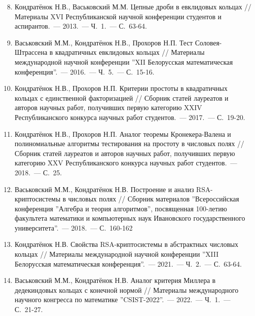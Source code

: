 \documentclass[_00_dissertation.tex]{subfiles}
\begin{document}
\begin{enumerate}
\setcounter{enumi}{7}

    \item \label{source:Republican_Scientific_Conference_of_Students_and_Postgraduates_2013}
    Кондратёнок Н.В., Васьковский М.М. Цепные дроби в евклидовых кольцах // Материалы XVI Республиканской научной конференции студентов и аспирантов.~--- 2013.~--- Ч.~1.~--- С.~63-64.

    \item \label{source:XII_Belarussian_math_conference_2016}
    Васьковский М.М., Кондратёнок Н.В., Прохоров Н.П. Тест Соловея-Штрассена в квадратичных евклидовых кольцах // Материалы международной научной конференции ''XII Белорусская математическая конференция''.~--- 2016.~--- Ч.~5.~--- С.~15-16.

    \item \label{source:Collection_of_articles_by_laureates_2017}
    Кондратёнок Н.В., Прохоров Н.П. Критерии простоты в квадратичных кольцах с единственной факторизацией // Сборник статей лауреатов и авторов научных работ, получивших первую категорию XXIV Республиканского конкурса научных работ студентов.~--- 2017.~--- С.~19-20.

    \item \label{source:Collection_of_articles_by_laureates_2018}
    Кондратёнок Н.В., Прохоров Н.П. Аналог теоремы Кронекера-Валена и полиномиальные алгоритмы тестирования на простоту в числовых полях // Сборник статей лауреатов и авторов научных работ, получивших первую категорию XXV Республиканского конкурса научных работ студентов.~--- 2018.~--- С.~25.

    \item \label{source:Algebra_and_theory_of_algorithms}
    Васьковский М.М., Кондратёнок Н.В. Построение и анализ RSA-криптосистемы в числовых полях // Сборник материалов ''Всероссийская конференция ''Алгебра и теория алгоритмов'', посвященная 100-летию факультета математики и компьютерных наук Ивановского государственного университета''.~--- 2018.~--- С.~160-162

    \item \label{source:XIII_Belarussian_math_conference_2021}
    Кондратёнок Н.В. Свойства RSA-криптосистемы в абстрактных числовых кольцах // Материалы международной научной конференции ''XIII Белорусская математическая конференция''.~--- 2021.~--- Ч.~2.~--- С.~63-64.

    \item \label{source:CSIST_2022}
    Васьковский М.М., Кондратёнок Н.В. Аналог критерия Миллера в дедекиндовых кольцах с конечной нормой // Материалы международного научного конгресса по математике ''CSIST-2022''.~--- 2022.~--- Ч.~1.~--- С.~21-27.

\end{enumerate}

\end{document}
